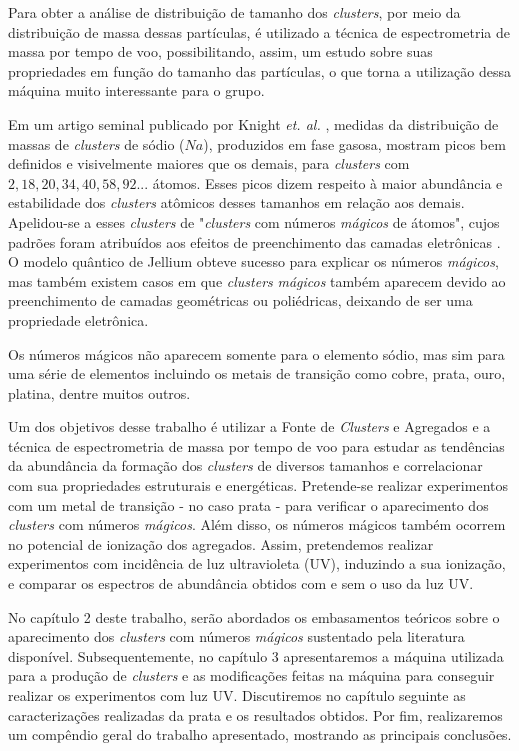 Para obter a análise de distribuição de tamanho dos \textit{clusters}, por meio da distribuição de massa dessas partículas, é utilizado a técnica de espectrometria de massa por tempo de voo, possibilitando, assim, um estudo sobre suas propriedades em função do tamanho das partículas, o que torna a utilização dessa máquina muito interessante para o grupo.


Em um artigo seminal publicado por Knight \textit{et. al.} \cite{electronic_Shell_sodium}, medidas da distribuição de massas de \textit{clusters} de sódio ($Na$), produzidos em fase gasosa, mostram picos bem definidos e visivelmente maiores que os demais, para \textit{clusters} com $2, 18, 20, 34, 40, 58,92 ...$ átomos. Esses picos dizem respeito à maior abundância e estabilidade dos \textit{clusters} atômicos desses tamanhos em relação aos demais. Apelidou-se a esses \textit{clusters} de "\textit{clusters} com números
\textit{mágicos} de átomos", cujos padrões foram atribuídos aos efeitos de preenchimento das camadas eletrônicas \cite{Brack}. O modelo quântico de Jellium \cite{jellium} obteve sucesso para explicar os números \textit{mágicos}, mas também existem casos em que \textit{clusters} \textit{mágicos} também aparecem devido ao preenchimento de camadas geométricas ou poliédricas, deixando de ser uma propriedade eletrônica.


Os números mágicos não aparecem somente para o elemento sódio, mas sim para uma série de elementos incluindo os metais de transição como \cite{magic_1B}  cobre, prata, ouro, platina, dentre muitos outros.

Um dos objetivos desse trabalho é utilizar a Fonte de \textit{Clusters} e Agregados e a técnica de espectrometria de massa por tempo de voo para estudar as tendências da abundância da formação dos \textit{clusters} de diversos tamanhos e correlacionar com sua propriedades estruturais e energéticas. Pretende-se realizar experimentos com um metal de transição - no caso prata - para verificar o aparecimento dos \textit{clusters} com números \textit{mágicos}. Além disso, os números mágicos também ocorrem no potencial de ionização dos agregados. Assim, pretendemos realizar experimentos com incidência de luz ultravioleta (UV), induzindo a sua ionização, e comparar os espectros de abundância obtidos com e sem o uso da luz UV. 

No capítulo 2 deste trabalho, serão  abordados os embasamentos teóricos sobre o aparecimento dos \textit{clusters} com números \textit{mágicos} sustentado pela literatura disponível. Subsequentemente, no capítulo 3 apresentaremos a máquina utilizada para a produção de \textit{clusters} e as modificações feitas na máquina para conseguir realizar os experimentos com luz UV. Discutiremos no capítulo seguinte as caracterizações
realizadas da prata e os resultados obtidos. Por fim, realizaremos um
compêndio geral do trabalho apresentado, mostrando as principais conclusões. 



 